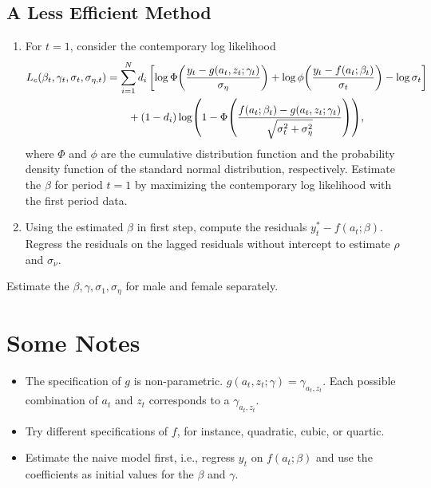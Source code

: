 \documentclass[a4paper, 12pt]{article}
\begin{document}
\subsection{A Less Efficient Method}
\begin{enumerate}
    \item For $t = 1$, consider the contemporary log likelihood 
    \begin{equation*}
        \begin{split}
            L_c(\beta_t,\gamma_t,\sigma_t,\sigma_{\eta,t}) &= \sum_{i=1}^N d_i\sbrc{\log\Phi\pth{\frac{y_t - g(a_t,z_t;\gamma_t)}{\sigma_\eta}} + \log\phi\pth{\frac{y_t - f(a_t;\beta_t)}{\sigma_t}} - \log\sigma_t} \\
            &\qquad + (1 - d_i)\log\pth{1 - \Phi\pth{\frac{f(a_t;\beta_t) - g(a_t,z_t;\gamma_t)}{\sqrt{\sigma_t^2 + \sigma_\eta^2}}}},
        \end{split}
    \end{equation*}
    where $\Phi$ and $\phi$ are the cumulative distribution function and the probability 
    density function of the standard normal distribution, respectively. Estimate the 
    $\beta$ for period $t = 1$ by maximizing the contemporary log likelihood with the first 
    period data.  
    \item Using the estimated $\beta$ in first step, compute the residuals $y_t^* - f(a_t;\beta)$. 
    Regress the residuals on the lagged residuals without intercept to estimate $\rho$ and $\sigma_\nu$. 
\end{enumerate}
Estimate the $\beta,\gamma,\sigma_1,\sigma_\eta$ for male and female separately. 

\section{Some Notes}
\begin{itemize}
    \item The specification of $g$ is non-parametric. $g(a_t,z_t;\gamma) = \gamma_{a_t,z_t}$. Each possible 
    combination of $a_t$ and $z_t$ corresponds to a $\gamma_{a_t,z_t}$.
    \item Try different specifications of $f$, for instance, quadratic, cubic, or quartic. 
    \item Estimate the naive model first, i.e., regress $y_t$ on $f(a_t;\beta)$ and use 
    the coefficients as initial values for the $\beta$ and $\gamma$.
\end{itemize}

%
%
\end{document}
